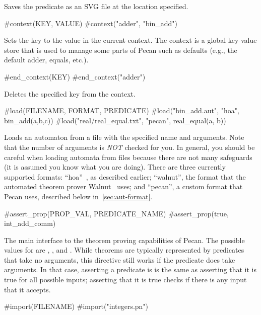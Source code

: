 Saves the predicate as an SVG file at the location specified.

\begin{pecan}
#context(KEY, VALUE)
#context("adder", "bin_add")
\end{pecan}

Sets the key to the value in the current context.
The context is a global key-value store that is used to manage some parts of Pecan such as defaults (e.g., the default adder, equals, etc.).

\begin{pecan}
#end_context(KEY)
#end_context("adder")
\end{pecan}

Deletes the specified key from the context.

\begin{pecan}
#load(FILENAME, FORMAT, PREDICATE)
#load("bin_add.aut", "hoa", bin_add(a,b,c))
#load("real/real_equal.txt", "pecan", real_equal(a, b))
\end{pecan}

Loads an automaton from a file with the specified name and arguments.
Note that the number of arguments is \emph{NOT} checked for you.
In general, you should be careful when loading automata from files because there are not many safeguards (it is assumed you know what you are doing).
There are three currently supported formats: ``hoa''~\cite{hoa-format}, as described earlier; ``walnut'', the format that the automated theorem prover Walnut~\cite{walnut} uses; and ``pecan'', a custom format that Pecan uses, described below in~\ref{sec:aut-format}.

\begin{pecan}
#assert_prop(PROP_VAL, PREDICATE_NAME)
#assert_prop(true, int_add_comm)
\end{pecan}

The main interface to the theorem proving capabilities of Pecan.
The possible values for  are , , and .
While theorems are typically represented by predicates that take no arguments, this directive still works if the predicate does take arguments.
In that case, asserting a predicate is  is the same as asserting that it is true for all possible inputs; asserting that it is  true checks if there is any input that it accepts.

\begin{pecan}
#import(FILENAME)
#import("integers.pn")
\end{pecan}

